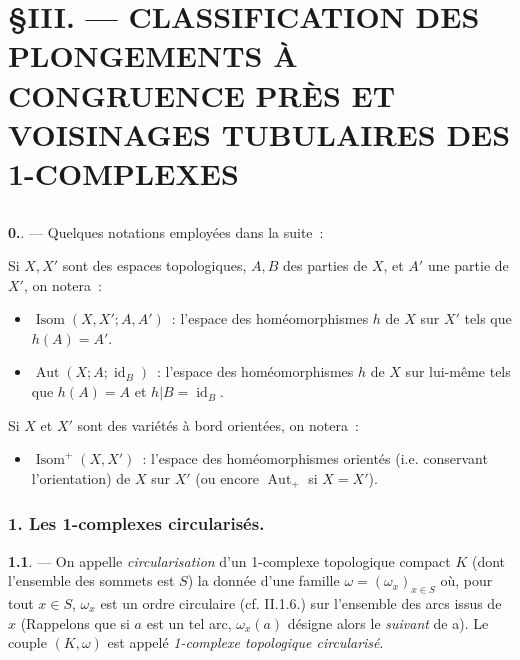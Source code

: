 

\chapter*{\S \space III. --- CLASSIFICATION DES PLONGEMENTS À CONGRUENCE PRÈS ET VOISINAGES TUBULAIRES DES 1-COMPLEXES}
\section*{}

{\bf 0.}. --- Quelques notations employées dans la suite~:

Si $X, X'$ sont des espaces topologiques, $A, B$ des parties de $X$, et $A'$ une partie de $X'$, on notera~:
\begin{itemize}
    \item[] $\operatorname{Isom}(X,X'; A,A')$~: l'espace des homéomorphismes $h$ de $X$ sur $X'$ tels que $h(A) = A'$.
    \item[] $\operatorname{Aut}(X;A; \operatorname{id}_B)$~: l'espace des homéomorphismes $h$ de $X$ sur lui-même tels que $h(A) = A$ et $h|B = \operatorname{id}_B$.
\end{itemize}
Si $X$ et $X'$ sont des variétés à bord orientées, on notera~:
\begin{itemize}
    \item[] $\operatorname{Isom}^+(X, X')$~: l'espace des homéomorphismes orientés (i.e. conservant l'orientation) de $X$ sur $X'$ (ou encore $\operatorname{Aut}_+$ si $X = X'$).
\end{itemize}

\subsection*{1. Les 1-complexes circularisés.}

{\bf 1.1}. --- On appelle \emph{circularisation} d'un 1-complexe topologique compact $K$ (dont l'ensemble des sommets est $S$) la donnée d'une famille $\omega = (\omega_x)_{x \in S}$ où, pour tout $x \in S$, $\omega_x$ est un ordre circulaire (cf. II.1.6.) sur l'ensemble des arcs issus de $x$ (Rappelons que si $a$ est un tel arc, $\omega_x(a)$ désigne alors le \emph{suivant} de a). Le couple $(K, \omega)$ est appelé \emph{1-complexe topologique circularisé}.

